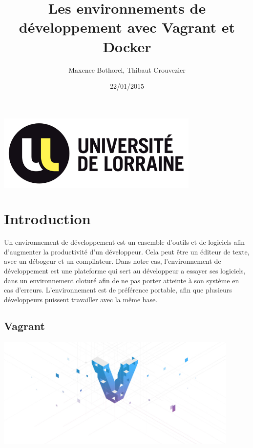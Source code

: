 \documentclass[12pt,a4paper]{article}
\title{Les environnements de développement avec Vagrant et Docker}
\author{Maxence Bothorel, Thibaut Crouvezier}
\date{22/01/2015}
\begin{document}
\maketitle{}

\begin{center}
  \includegraphics[width=10cm]{images_rapport/univ_logo.jpg}
\end{center}

\newpage{}

\tableofcontents{}

\newpage{}

\section{Introduction}
Un environnement de développement est un ensemble d'outils et de logiciels afin d'augmenter la productivité d'un développeur. Cela peut être un éditeur de texte, avec un débogeur et un compilateur. Dans notre cas, l'environnement de développement est une plateforme qui sert au développeur a essayer ses logiciels, dans un environnement cloturé afin de ne pas porter atteinte à son système en cas d'erreurs. L'environnement est de préférence portable, afin que plusieurs développeurs puissent travailler avec la même base.

\subsection{Vagrant}
\begin{center}
  \includegraphics[width=12cm]{images_rapport/vagrant_logo.jpg}
\end{center}
\end{document}
